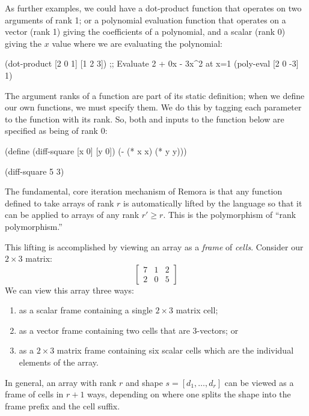 As further examples,
we could have a dot-product function  that
operates on two arguments of rank 1;
or a polynomial evaluation function  that operates
on a vector (rank 1) giving the coefficients of a polynomial,
and a scalar (rank 0) giving the $x$ value where we are
evaluating the polynomial:
\begin{code}
    (dot-product [2 0 1] [1 2 3])
    ;; Evaluate 2 + 0x - 3x^2 at x=1
    (poly-eval [2 0 -3] 1)
\end{code}

The argument ranks of a function are part of its static definition;
    when we define our own functions, we must specify them.
We do this by tagging each parameter to the function with its rank.
So, both  and  inputs to the  function below
are specified as being of rank 0:
\begin{code}
    (define (diff-square [x 0] [y 0])
      (- (* x x)
         (* y y)))

    (diff-square 5 3)
\end{code}

The fundamental, core iteration mechanism of Remora is that
any function defined to take arrays of rank $r$
is automatically lifted by the language so that it can be applied
to arrays of any rank $r' \geq r$.
This is the polymorphism of ``rank polymorphism.''

This lifting is accomplished by viewing an array as
a \emph{frame} of \emph{cells}.
Consider our $2\times 3$ matrix:
\[
\left[\begin{array}{ccc} 7 & 1 & 2 \\ 2 & 0 & 5\end{array}\right]
\]
We can view this array three ways:
\begin{enumerate}
\item as a scalar frame containing a single $2\times 3$ matrix cell;
\item as a vector frame containing two cells that are 3-vectors; or
\item as a $2\times 3$ matrix frame containing six scalar cells which
    are the individual elements of the array.
\end{enumerate}
In general, an array with rank $r$ and shape $s = [d_1,\ldots,d_r]$
can be viewed as a frame of cells in $r+1$ ways, depending on where
one splits the shape into the frame prefix and the cell suffix.

